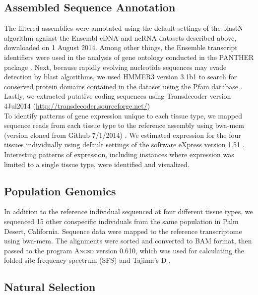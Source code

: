 \documentclass[12pt]{article}
\begin{document}
\subsection*{Assembled Sequence Annotation}



The filtered assemblies were annotated using the default settings of the blastN algorithm \citep{Camacho:2009fc} against the Ensembl cDNA and ncRNA datasets described above, downloaded on 1 August 2014. Among other things, the Ensemble transcript identifiers were used in the analysis of gene ontology conducted in the PANTHER package \citep{Mi:2004iv}. Next, because rapidly evolving nucleotide sequences may evade detection by blast algorithms, we used HMMER3 version 3.1b1 \citep{Wheeler:2013gj} to search for conserved protein domains contained in the dataset using the Pfam database \citep{Punta:2012ko}. Lastly, we extracted putative coding sequences using Transdecoder version 4Jul2014 (\url{http://transdecoder.sourceforge.net/})\\

To identify patterns of gene expression unique to each tissue type, we mapped sequence reads from each tissue type to the reference assembly using bwa-mem (version cloned from Github 7/1/2014)  \citep{Li:2013wn}. We estimated expression for the four tissues individually using default settings of the software eXpress version 1.51 \citep{Roberts:2012dh}. Interesting patterns of expression, including instances where expression was limited to a single tissue type, were identified and visualized. \\ 

\subsection*{Population Genomics}

In addition to the reference individual sequenced at four different tissue types, we sequenced 15 other conspecific individuals from the same population in Palm Desert, California. Sequence data were mapped to the reference transcriptome using bwa-mem. The alignments were sorted and converted to BAM format, then passed to the program \textsc{Angsd} version 0.610, which was used for calculating the folded site frequency spectrum (SFS) and Tajima's D \citep{Korneliussen:2013uz}. \\


\subsection*{Natural Selection}
\end{document}
